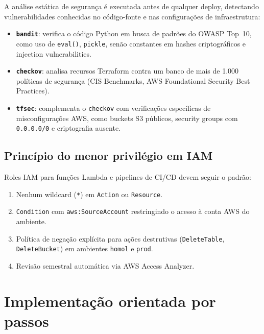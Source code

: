 A an\'alise est\'atica de seguran\c{c}a
\'e executada antes de qualquer deploy, detectando vulnerabilidades conhecidas
no c\'odigo-fonte e nas configura\c{c}\~oes de infraestrutura:

\begin{itemize}[leftmargin=*]
  \item \textbf{\texttt{bandit}}:
        verifica o c\'odigo Python em busca de padr\~oes do OWASP Top~10,
        como uso de \texttt{eval()}, \texttt{pickle}, sen\~ao constantes
        em hashes criptogr\'aficos e injection vulnerabilities.
  \item \textbf{\texttt{checkov}}:
        analisa recursos Terraform contra um banco de mais de 1.000
        pol\'iticas de seguran\c{c}a (CIS Benchmarks, AWS Foundational
        Security Best Practices).
  \item \textbf{\texttt{tfsec}}:
        complementa o \texttt{checkov} com verifica\c{c}\~oes espec\'ificas
        de misconfigura\c{c}\~oes AWS, como buckets S3 p\'ublicos,
        security groups com \texttt{0.0.0.0/0} e criptografia ausente.
\end{itemize}

\subsection{Princ\'ipio do menor privil\'egio em IAM}

Roles IAM para fun\c{c}\~oes Lambda e pipelines
de CI/CD devem seguir o padr\~ao:

\begin{enumerate}[leftmargin=*]
  \item Nenhum wildcard (\texttt{*}) em \texttt{Action} ou \texttt{Resource}.
  \item \texttt{Condition} com \texttt{aws:SourceAccount} restringindo
        o acesso \`a conta AWS do ambiente.
  \item Pol\'itica de nega\c{c}\~ao expl\'icita para a\c{c}\~oes
        destrutivas (\texttt{DeleteTable}, \texttt{DeleteBucket}) em
        ambientes \texttt{homol} e \texttt{prod}.
  \item Revis\~ao semestral autom\'atica via AWS Access Analyzer.
\end{enumerate}

\section{Implementa\c{c}\~ao orientada por passos}

